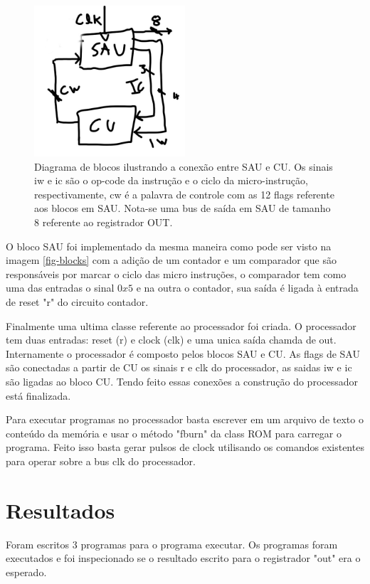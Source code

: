 \documentclass[11pt, twocolumn]{article}
\begin{document}
   \begin{figure}
     \includegraphics[width=0.5\textwidth]{cu.jpg}
     \caption{Diagrama de blocos ilustrando a conexão entre SAU e CU. Os sinais iw e ic são o op-code da instrução e o ciclo da micro-instrução, respectivamente, cw é a palavra de controle com as 12 flags referente aos blocos em SAU. Nota-se uma bus de saída em SAU de tamanho 8 referente ao registrador OUT.}
     \label{fig-cu}
   \end{figure}
 
O bloco SAU foi implementado da mesma maneira como pode ser visto na imagem \ref{fig-blocks} com a adição de um contador e um comparador que são responsáveis por marcar o ciclo das micro instruções, o comparador tem como uma das entradas o sinal $0x5$ e na outra o contador, sua saída é ligada à entrada de reset "r" do circuito contador.

Finalmente uma ultima classe referente ao processador foi criada. O processador tem duas entradas: reset (r) e clock (clk) e uma unica saída chamda de out. Internamente o processador é composto pelos blocos SAU e CU. As flags de SAU são conectadas a partir de CU os sinais r e clk do processador, as saidas iw e ic são ligadas ao bloco CU. Tendo feito essas conexões a construção do processador está finalizada.

Para executar programas no processador basta escrever em um arquivo de texto o conteúdo da memória e usar o método "fburn" da class ROM para carregar o programa. Feito isso basta gerar pulsos de clock utilisando os comandos existentes para operar sobre a bus clk do processador.

\section{Resultados}

Foram escritos 3 programas para o programa executar. Os programas foram executados e foi inspecionado se o resultado escrito para o registrador "out" era o esperado.
\end{document}
